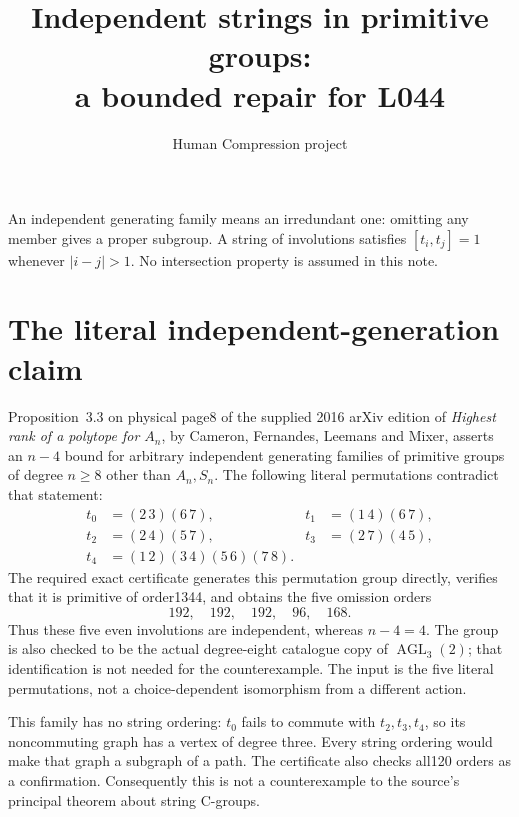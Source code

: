 \documentclass[11pt,a4paper]{article}
\title{Independent strings in primitive groups:\\a bounded repair for L044}
\author{Human Compression project}
\date{}
\begin{document}
\maketitle
An independent generating family means an irredundant one: omitting any
member gives a proper subgroup. A string of involutions satisfies
$[t_i,t_j]=1$ whenever $|i-j|>1$. No intersection property is assumed
in this note.

\section{The literal independent-generation claim}
Proposition~3.3 on physical page8 of the supplied 2016 arXiv edition of
\emph{Highest rank of a polytope for $A_n$}, by Cameron, Fernandes,
Leemans and Mixer, asserts an $n-4$ bound for arbitrary independent
generating families of primitive groups of degree $n\ge8$ other than
$A_n,S_n$. The following literal permutations contradict that statement:
\[
\begin{aligned}
 t_0&=(2\,3)(6\,7),&t_1&=(1\,4)(6\,7),\\
 t_2&=(2\,4)(5\,7),&t_3&=(2\,7)(4\,5),\\
 t_4&=(1\,2)(3\,4)(5\,6)(7\,8).
\end{aligned}
\]
The required exact certificate generates this permutation group directly,
verifies that it is primitive of order1344, and obtains the five
omission orders
\[
 192,\quad192,\quad192,\quad96,\quad168.
\]
Thus these five even involutions are independent, whereas $n-4=4$.
The group is also checked to be the actual degree-eight catalogue
copy of $\operatorname{AGL}_3(2)$; that identification is not needed
for the counterexample. The input is the five literal permutations,
not a choice-dependent isomorphism from a different action.

This family has no string ordering: $t_0$ fails to commute with
$t_2,t_3,t_4$, so its noncommuting graph has a vertex of degree three.
Every string ordering would make that graph a subgraph of a path.
The certificate also checks all120 orders as a confirmation.
Consequently this is not a counterexample to the source's principal
theorem about string C-groups.
\end{document}
